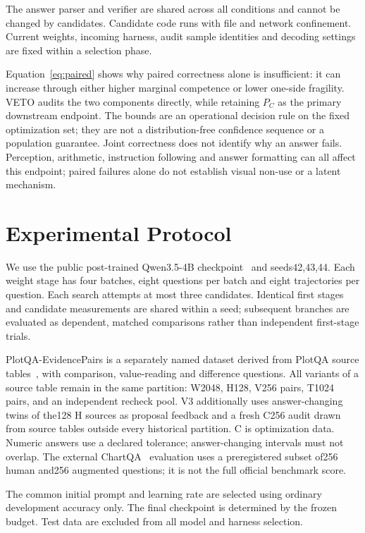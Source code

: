 \documentclass[10pt,twocolumn,letterpaper]{article}
\begin{document}
The answer parser and verifier are shared across all conditions and cannot be
changed by candidates. Candidate code runs with file and network confinement.
Current weights, incoming harness, audit sample identities and decoding settings
are fixed within a selection phase.

Equation~\ref{eq:paired} shows why paired correctness alone is insufficient:
it can increase through either higher marginal competence or lower one-side
fragility. VETO audits the two components directly, while retaining $P_C$ as
the primary downstream endpoint. The bounds are an operational decision rule
on the fixed optimization set; they are not a distribution-free confidence
sequence or a population guarantee.
Joint correctness does not identify why an answer fails. Perception, arithmetic,
instruction following and answer formatting can all affect this endpoint;
paired failures alone do not establish visual non-use or a latent mechanism.

\section{Experimental Protocol}
We use the public post-trained Qwen3.5-4B checkpoint~\cite{qwen35} and
seeds42,43,44. Each weight stage has four batches, eight
questions per batch and eight trajectories per question. Each search attempts
at most three candidates. Identical first stages and candidate measurements
are shared within a seed; subsequent branches are evaluated as dependent,
matched comparisons rather than independent first-stage trials.

PlotQA-EvidencePairs is a separately named dataset derived from PlotQA source
tables~\cite{plotqa}, with comparison, value-reading and difference questions.
All variants of a source table remain
in the same partition: W2048, H128, V256 pairs, T1024 pairs, and an independent
recheck pool. V3 additionally uses answer-changing twins of the128 H sources as
proposal feedback and a fresh C256 audit drawn from source tables outside every
historical partition. C is optimization data. Numeric answers use a declared
tolerance; answer-changing intervals must not overlap. The external ChartQA~\cite{chartqa}
evaluation uses a preregistered subset of256 human and256 augmented questions;
it is not the full official benchmark score.

The common initial prompt and learning rate are selected using ordinary
development accuracy only. The final checkpoint is determined by the frozen
budget. Test data are excluded from all model and harness selection.
\end{document}
